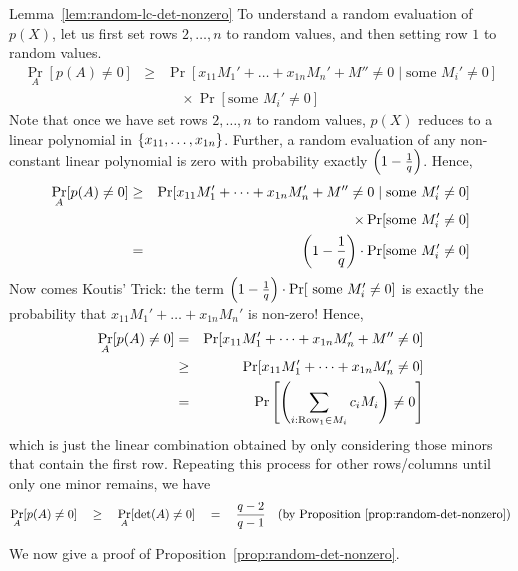 \documentclass{birkjour}
\begin{document}
\begin{proofof}{Lemma~\ref{lem:random-lc-det-nonzero}}
  To understand a random evaluation of $p(X)$, let us first set rows $2, \dots, n$ to random values, and
  then setting row $1$ to random values. 
  \begin{eqnarray*}
    \Pr_{A}[p(A)\neq 0] & \geq & \Pr[x_{11} M_1' + \dots + x_{1n} M_n' + M'' \neq 0 \;|\; \text{some }M_{i}'\neq 0]\\
    & & \quad \times \Pr[\text{some }M_i' \neq 0]
  \end{eqnarray*}
  Note that once we have set rows $2,\dots, n$ to random values, $p(X)$ reduces to a linear polynomial in $\left\{x_{11},\dots, x_{1n}\right\}$. Further, a random evaluation of any non-constant linear polynomial is zero with probability exactly $\left(1 -\frac{1}{q}\right)$. Hence, 
  \begin{eqnarray*}
\Pr_{A}[p(A)\neq 0] & \geq & \Pr[x_{11} M_1' + \dots + x_{1n} M_n' + M'' \neq 0 \;|\; \text{some }M_{i}'\neq 0]\\
 & & \quad \times \Pr[\text{some }M_i' \neq 0]\\
    & = & \left(1 - \frac{1}{q}\right)\cdot \Pr[\text{some }M_i' \neq 0]
  \end{eqnarray*}
  Now comes  Koutis' Trick: the term $\left(1 -
    \frac{1}{q}\right) \cdot \Pr[\text{ some }M_i' \neq 0]$ is exactly the
  probability that $x_{11}M_1' + \dots + x_{1n}M_n'$ is non-zero! Hence,
\begin{eqnarray*}
\Pr_{A}[p(A) \neq 0] & = & \Pr[ x_{11}M_1' + \dots + x_{1n} M_n' + M''\neq 0]\\
 & \geq & \Pr[ x_{11}M_1' + \dots + x_{1n} M_n'\neq 0]\\
 & = & \Pr\left[\left(\sum_{i:\text{Row}_1\in M_i} c_i M_i\right) \neq 0\right]
\end{eqnarray*}
which is just the linear combination obtained by only considering
those minors that contain the first row. Repeating this process for other
rows/columns until only  one minor remains, we have
$$
\Pr_{A}[p(A) \neq 0] \quad \geq \quad \Pr_{A}[\det(A) \neq 0] \quad = \quad
\frac{q-2}{q-1}\quad(\text{by Proposition~\ref{prop:random-det-nonzero}})
$$
\end{proofof}


We now give a proof of Proposition~\ref{prop:random-det-nonzero}. 
\end{document}
